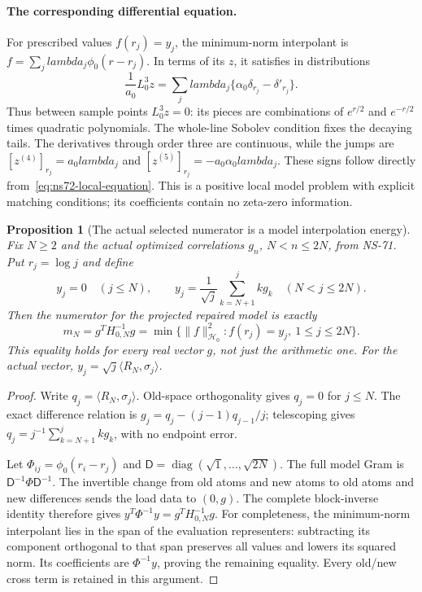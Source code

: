 \documentclass[11pt]{article}
\def\lambda{lambda}%
\newtheorem{proposition}[theorem]{Proposition}
\theoremstyle{remark}
\begin{document}
\paragraph{The corresponding differential equation.}
For prescribed values $f(r_j)=y_j$, the minimum-norm interpolant is
$f=\sum_j\lambda_j\phi_0(r-r_j)$. In terms of its $z$, it satisfies
in distributions
\begin{equation}
 \frac1{a_0}L_0^3z
     =\sum_j\lambda_j\{\alpha_0\delta_{r_j}-\delta'_{r_j}\}.
 \label{eq:ns72-local-equation}
\end{equation}
Thus between sample points $L_0^3z=0$: its pieces are combinations
of $e^{r/2}$ and $e^{-r/2}$ times quadratic polynomials.
The whole-line Sobolev condition fixes the decaying tails.
The derivatives through order three are continuous, while the jumps are
$[z^{(4)}]_{r_j}=a_0\lambda_j$ and
$[z^{(5)}]_{r_j}=-a_0\alpha_0\lambda_j$.
These signs follow directly from~\eqref{eq:ns72-local-equation}.
This is a positive local model problem with explicit matching conditions;
its coefficients contain no zeta-zero information.

\begin{proposition}[The actual selected numerator is a model interpolation energy]
\label{prop:ns72-interpolation}
Fix $N\geq2$ and the actual optimized correlations $g_n$,
$N<n\leq2N$, from NS-71. Put $r_j=\log j$ and define
\begin{equation}
 y_j=0\quad(j\leq N),\qquad
 y_j=\frac1{\sqrt j}\sum_{k=N+1}^j k g_k\quad(N<j\leq2N).
 \label{eq:ns72-data}
\end{equation}
Then the numerator for the projected repaired model is exactly
\begin{equation}
 m_N=g^TH_{0,N}^{-1}g
       =\min\{\|f\|_{\mathcal H_0}^2:
                          f(r_j)=y_j,\ 1\leq j\leq2N\}.
 \label{eq:ns72-interpolation-numerator}
\end{equation}
This equality holds for every real vector $g$, not just the arithmetic one.
For the actual vector, $y_j=\sqrt j\langle R_N,\sigma_j\rangle$.
\end{proposition}
\begin{proof}
Write $q_j=\langle R_N,\sigma_j\rangle$.
Old-space orthogonality gives $q_j=0$ for $j\leq N$.
The exact difference relation is
$g_j=q_j-(j-1)q_{j-1}/j$; telescoping gives
$q_j=j^{-1}\sum_{k=N+1}^jkg_k$, with no endpoint error.

Let $\Phi_{ij}=\phi_0(r_i-r_j)$ and
$\mathsf D=\operatorname{diag}(\sqrt1,\ldots,\sqrt{2N})$.
The full model Gram is $\mathsf D^{-1}\Phi\mathsf D^{-1}$.
The invertible change from old atoms and new atoms to old atoms and
new differences sends the load data to $(0,g)$.
The complete block-inverse identity therefore gives
$y^T\Phi^{-1}y=g^TH_{0,N}^{-1}g$.
For completeness, the minimum-norm interpolant lies in the span of
the evaluation representers: subtracting its component orthogonal to
that span preserves all values and lowers its squared norm.
Its coefficients are $\Phi^{-1}y$, proving the remaining equality.
Every old/new cross term is retained in this argument.
\end{proof}
\end{document}
